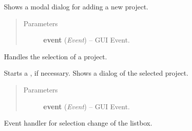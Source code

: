 \documentclass[letterpaper,10pt,english]{sphinxmanual}
\begin{document}
\begin{fulllineitems}
\begin{fulllineitems}
\begin{quote}
\begin{description}
\end{description}\end{quote}

\end{fulllineitems}


\begin{fulllineitems}
\label{dialogs:dialogs.ProjectSelectDialog.OnProjectEdit}
Shows a modal dialog for adding a new project.
\begin{quote}\begin{description}
\item[{Parameters}] \leavevmode
\textbf{event} (\emph{Event}) -- GUI Event.

\end{description}\end{quote}

\end{fulllineitems}


\begin{fulllineitems}
\label{dialogs:dialogs.ProjectSelectDialog.OnProjectSelect}
Handles the selection of a project.

Starts a , if necessary.
Shows a dialog of the selected project.
\begin{quote}\begin{description}
\item[{Parameters}] \leavevmode
\textbf{event} (\emph{Event}) -- GUI Event.

\end{description}\end{quote}

\end{fulllineitems}


\begin{fulllineitems}
\label{dialogs:dialogs.ProjectSelectDialog.OnSelectionChange}
Event handler for selection change of the listbox.

\end{fulllineitems}


\end{fulllineitems}
\end{document}
